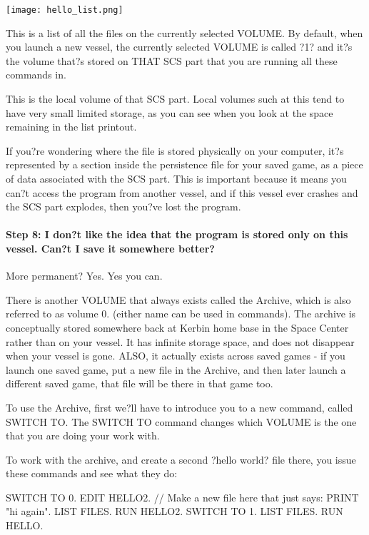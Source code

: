 \begin{center}
\texttt{[image: hello\_list.png]}
\end{center}

This is a list of all the files on the currently selected VOLUME. By default, when you launch a new vessel, the currently selected VOLUME is called ?1? and it?s the volume that?s stored on THAT SCS part that you are running all these commands in.

This is the local volume of that SCS part. Local volumes such at this tend to have very small limited storage, as you can see when you look at the space remaining in the list printout.

If you?re wondering where the file is stored physically on your computer, it?s represented by a section inside the persistence file for your saved game, as a piece of data associated with the SCS part. This is important because it means you can?t access the program from another vessel, and if this vessel ever crashes and the SCS part explodes, then you?ve lost the program.

\paragraph{Step 8: I don?t like the idea that the program is stored only on this vessel. Can?t I save it somewhere better? }More permanent?
Yes. Yes you can.

There is another VOLUME that always exists called the Archive, which is also referred to as volume 0. (either name can be used in commands). The archive is conceptually stored somewhere back at Kerbin home base in the Space Center rather than on your vessel. It has infinite storage space, and does not disappear when your vessel is gone. ALSO, it actually exists across saved games - if you launch one saved game, put a new file in the Archive, and then later launch a different saved game, that file will be there in that game too.

To use the Archive, first we?ll have to introduce you to a new command, called SWITCH TO. The SWITCH TO command changes which VOLUME is the one that you are doing your work with.

To work with the archive, and create a second ?hello world? file there, you issue these commands and see what they do:

\begin{framed}
SWITCH TO 0.
EDIT HELLO2. // Make a new file here that just says: PRINT "hi again".
LIST FILES.
RUN HELLO2.
SWITCH TO 1.
LIST FILES.
RUN HELLO.
\end{framed}


